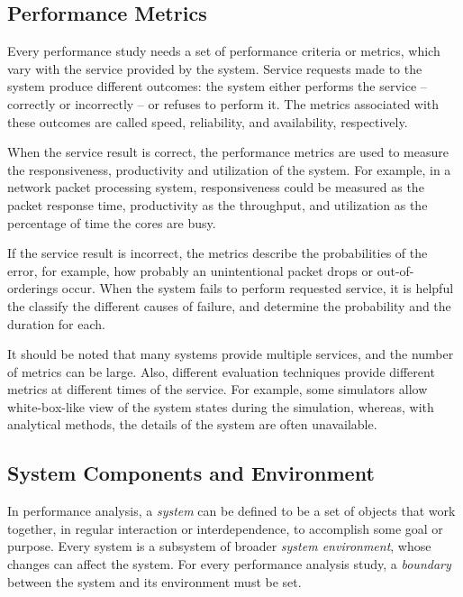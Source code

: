 \subsection{Performance Metrics}
Every performance study needs a set of performance criteria or metrics, which vary with the service provided by the system. Service requests made to the system produce different outcomes: the system either performs the service -- correctly or incorrectly -- or refuses to perform it. The metrics associated with these outcomes are called speed, reliability, and availability, respectively.~\cite{jain:1991:AOCSPA}

When the service result is correct, the performance metrics are used to measure the responsiveness, productivity and utilization of the system. For example, in a network packet processing system, responsiveness could be measured as the packet response time, productivity as the throughput, and utilization as the percentage of time the cores are busy.~\cite{jain:1991:AOCSPA}

If the service result is incorrect, the metrics describe the probabilities of the error, for example, how probably an unintentional packet drops or out-of-orderings occur. When the system fails to perform requested service, it is helpful the classify the different causes of failure, and determine the probability and the duration for each.~\cite{jain:1991:AOCSPA}

It should be noted that many systems provide multiple services, and the number of metrics can be large. Also, different evaluation techniques provide different metrics at different times of the service. For example, some simulators allow white-box-like view of the system states during the simulation, whereas, with analytical methods, the details of the system are often unavailable.~\cite{jain:1991:AOCSPA}

\subsection{System Components and Environment}
\label{sec:syst-comp-envir}

In performance analysis, a \emph{system} can be defined to be a set of objects that work together, in regular interaction or interdependence, to accomplish some goal or purpose. Every system is a subsystem of broader \emph{system environment}, whose changes can affect the system. For every performance analysis study, a \emph{boundary} between the system and its environment must be set.~\cite{Banks:2010:DES}

